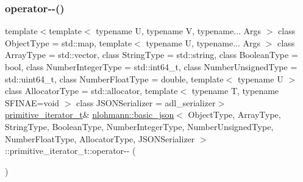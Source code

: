 \subsubsection{\texorpdfstring{operator-\/-\/()}{operator--()}\hspace{0.1cm}{\footnotesize\ttfamily [1/2]}}
{\footnotesize\ttfamily template$<$template$<$ typename U, typename V, typename... Args $>$ class Object\+Type = std\+::map, template$<$ typename U, typename... Args $>$ class Array\+Type = std\+::vector, class String\+Type  = std\+::string, class Boolean\+Type  = bool, class Number\+Integer\+Type  = std\+::int64\+\_\+t, class Number\+Unsigned\+Type  = std\+::uint64\+\_\+t, class Number\+Float\+Type  = double, template$<$ typename U $>$ class Allocator\+Type = std\+::allocator, template$<$ typename T, typename S\+F\+I\+N\+A\+E=void $>$ class J\+S\+O\+N\+Serializer = adl\+\_\+serializer$>$ \\
\hyperlink{classnlohmann_1_1basic__json_1_1primitive__iterator__t}{primitive\+\_\+iterator\+\_\+t}\& \hyperlink{classnlohmann_1_1basic__json}{nlohmann\+::basic\+\_\+json}$<$ Object\+Type, Array\+Type, String\+Type, Boolean\+Type, Number\+Integer\+Type, Number\+Unsigned\+Type, Number\+Float\+Type, Allocator\+Type, J\+S\+O\+N\+Serializer $>$\+::primitive\+\_\+iterator\+\_\+t\+::operator-\/-\/ (\begin{DoxyParamCaption}{ }\end{DoxyParamCaption})\hspace{0.3cm}{\ttfamily [inline]}}

\mbox{\label{classnlohmann_1_1basic__json_1_1primitive__iterator__t_a93f7ba811fe77cc070aff46e0dabffb3}} 
